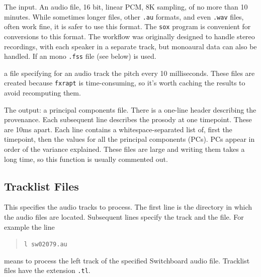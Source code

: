 \documentclass[11pt]{article}
\begin{document}
\begin{description}   \setlength{\itemsep}{0pt}\setlength{\parskip}{0pt}

\item [---.au] The input.  An audio file, 16 bit, linear PCM, 8K
  sampling, of no more than 10 minutes.  While sometimes longer files,
  other {\tt .au} formats, and even {\tt .wav} files, often work fine,
  it is safer to use this format. The {\tt sox} program is convenient
  for conversions to this format.  The workflow was originally
  designed to handle stereo recordings, with each speaker in a
  separate track, but monoaural data can also be handled.  If an mono
  {\tt .fss} file (see below) is used.

\item[---f0.mat] a file specifying for an audio track the pitch every
  10 milliseconds.  These files are created because {\tt fxrapt} is
  time-consuming, so it's worth caching the results to avoid
  recomputing them.

\item[---.pc] The output: a principal components file.  There is a
  one-line header describing the provenance.  Each subsequent line
  describes the prosody at one timepoint.  These are 10ms apart.  Each
  line contains a whitespace-separated list of, first the timepoint,
  then the values for all the principal components (PCs).  PCs appear
  in order of the variance explained.  These files are large and
  writing them takes a long time, so this function is usually
  commented out.
\end{description}


\subsection{Tracklist Files}       \label{tracklist-files}

This specifies the audio tracks to process.  The first line is the
directory in which the audio files are located.  Subsequent lines
specify the track and the file.  For example the line

\begin{quote}
\verb+l sw02079.au+
\end{quote}

means to process the left track of the specified Switchboard audio
file.  Tracklist files have the extension {\tt .tl}. 


\end{document}
